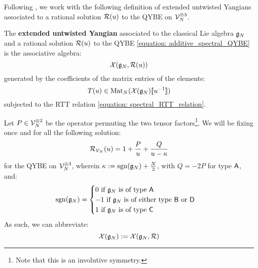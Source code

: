         Following \cite[Definition 2.1]{guay_regelskis_twisted_yangians_for_symmetric_pairs_of_types_BCD}, we work with the following definition of extended untwisted Yangians associated to a rational solution $\mathcal{R}(u)$ to the QYBE on $\calV_N^{\tensor 3}$.
        \begin{definition} \label{def: extended_untwisted_yangians}
            The \textbf{extended untwisted Yangian} associated to the classical Lie algebra $\mathfrak{g}_N$ and a rational solution $\mathcal{R}(u)$ to the QYBE \eqref{equation: additive_spectral_QYBE} is the associative algebra:
                $$\mathcal{X}(\mathfrak{g}_N, \mathcal{R}(u))$$
            generated by the coefficients of the matrix entries of the elements:
                $$T(u) \in \operatorname{Mat}_N( \mathcal{X}(\mathfrak{g}_N)[\![u^{-1}]\!] )$$
            subjected to the RTT relation \eqref{equation: spectral_RTT_relation}.
        \end{definition}

        Let $P \in \calV_N^{\tensor 2}$ be the operator permuting the two tensor factors\footnote{Note that this is an involutive symmetry.}. We will be fixing once and for all the following solution:
            $$\mathcal{R}_{\mathcal{V}_N}(u) = 1 + \frac{P}{u} + \frac{Q}{u - \kappa}$$
        for the QYBE on $\calV_N^{\tensor 3}$, wherein $\kappa := \operatorname{sgn}(\mathfrak{g}_N) + \frac{N}{2}$, with $Q = -2P$ for type $\mathsf{A}$, and:
            \begin{equation} \label{equation: ABCD_signature}
                \operatorname{sgn}(\mathfrak{g}_N) =
                \begin{cases}
                    \text{$0$ if $\mathfrak{g}_N$ is of type $\mathsf{A}$}
                    \\
                    \text{$-1$ if $\mathfrak{g}_N$ is of either type $\mathsf{B}$ or $\mathsf{D}$}
                    \\
                    \text{$1$ if $\mathfrak{g}_N$ is of type $\mathsf{C}$}
                \end{cases}
            \end{equation}
        As such, we can abbreviate:
            $$\mathcal{X}(\mathfrak{g}_N) := \mathcal{X}(\mathfrak{g}_N, \mathcal{R})$$

